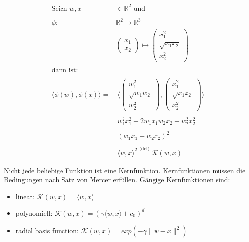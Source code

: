 \begin{equation}
\label{eq:svm_kernel_example}
\begin{split}
    \text{Seien } w,x & \in \mathbb{R}^2 \text{ und}\\
    \\
    \phi : & \mathbb{R}^2 \to \mathbb{R}^3\\
    & \begin{pmatrix}
    x_1 \\
    x_2
    \end{pmatrix}
    \mapsto
    \begin{pmatrix}
    x_1^2 \\
    \sqrt{x_1x_2} \\
    x_2^2
    \end{pmatrix}\\
    \\
    \text{dann ist:} &\\
    \\
    \langle \phi(w),\phi(x) \rangle = & \:\langle \begin{pmatrix}
    w_1^2 \\
    \sqrt{w_1w_2} \\
    w_2^2
    \end{pmatrix},
    \begin{pmatrix}
    x_1^2 \\
    \sqrt{x_1x_2} \\
    x_2^2
    \end{pmatrix} \rangle \\
    \\
    = & \:w_1^2x_1^2 + 2 w_1x_1w_2x_2 + w_2^2x_2^2 \\
    \\
    = & \:(w_1x_1 + w_2x_2)^2 \\
    \\
    = & \:\langle w,x \rangle^2 \overset{\text{(def)}}= \mathcal{K}(w,x)
\end{split}
\end{equation}

Nicht jede beliebige Funktion ist eine Kernfunktion. Kernfunktionen müssen die Bedingungen nach Satz von Mercer \cite[S. 127]{Marsland} erfüllen. 
Gängige Kernfunktionen sind:
\begin{itemize}
\item{linear: $\mathcal{K}(w,x) = \langle w,x \rangle$}
\item{polynomiell: $\mathcal{K}(w,x) = (\gamma\langle w,x \rangle+c_0)^d$}
\item{radial basis function: $\mathcal{K}(w,x) = exp(- \gamma \|w - x \| ^2)$}
\end{itemize}


